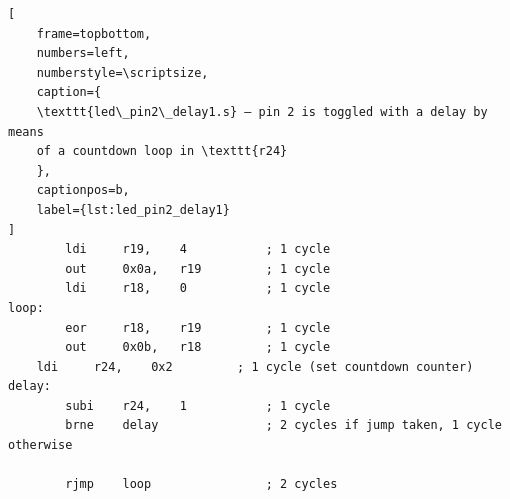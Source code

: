 \documentclass[a4paper,12pt]{article}
\begin{document}
\begin{listing}[htbp]
\begin{lstlisting}[
    frame=topbottom,
    numbers=left,
    numberstyle=\scriptsize,
    caption={
	\texttt{led\_pin2\_delay1.s} – pin 2 is toggled with a delay by means
	of a countdown loop in \texttt{r24}
    },
    captionpos=b,
    label={lst:led_pin2_delay1}
]
        ldi     r19,    4           ; 1 cycle
        out     0x0a,   r19         ; 1 cycle
        ldi     r18,    0           ; 1 cycle
loop:
        eor     r18,    r19         ; 1 cycle
        out     0x0b,   r18         ; 1 cycle
	ldi     r24,    0x2         ; 1 cycle (set countdown counter)
delay:
        subi    r24,    1           ; 1 cycle
        brne    delay               ; 2 cycles if jump taken, 1 cycle otherwise

        rjmp    loop                ; 2 cycles
\end{lstlisting}
\end{listing}
\end{document}
